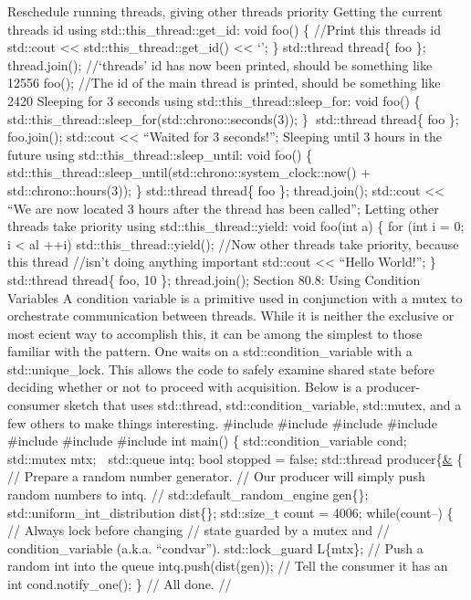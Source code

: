Reschedule running threads, giving other threads priority Getting the
current threads id using std::this\_thread::get\_id: void foo() \{
//Print this threads id std::cout \textless\textless{}
std::this\_thread::get\_id() \textless\textless{} `\n'; \} std::thread
thread\{ foo \}; thread.join(); //`threads' id has now been printed,
should be something like 12556 foo(); //The id of the main thread is
printed, should be something like 2420 Sleeping for 3 seconds using
std::this\_thread::sleep\_for: void foo() \{
std::this\_thread::sleep\_for(std::chrono::seconds(3)); \} std::thread
thread\{ foo \}; foo.join(); std::cout \textless\textless{} ``Waited for
3 seconds!\n''; Sleeping until 3 hours in the future using
std::this\_thread::sleep\_until: void foo() \{
std::this\_thread::sleep\_until(std::chrono::system\_clock::now() +
std::chrono::hours(3)); \} std::thread thread\{ foo \}; thread.join();
std::cout \textless\textless{} ``We are now located 3 hours after the
thread has been called\n''; Letting other threads take priority using
std::this\_thread::yield: void foo(int a) \{ for (int i = 0; i
\textless{} al ++i) std::this\_thread::yield(); //Now other threads take
priority, because this thread //isn't doing anything important std::cout
\textless\textless{} ``Hello World!\n''; \} std::thread thread\{ foo, 10
\}; thread.join(); Section 80.8: Using Condition Variables A condition
variable is a primitive used in conjunction with a mutex to orchestrate
communication between threads. While it is neither the exclusive or most
ecient way to accomplish this, it can be among the simplest to those
familiar with the pattern. One waits on a std::condition\_variable with
a std::unique\_lock. This allows the code to safely examine shared state
before deciding whether or not to proceed with acquisition. Below is a
producer-consumer sketch that uses std::thread,
std::condition\_variable, std::mutex, and a few others to make things
interesting. \#include \#include \#include \#include \#include \#include
\#include int main() \{ std::condition\_variable cond; std::mutex mtx; 
std::queue intq; bool stopped = false; std::thread producer\{\href{}{\&}
\{ // Prepare a random number generator. // Our producer will simply
push random numbers to intq. // std::default\_random\_engine gen\{\};
std::uniform\_int\_distribution dist\{\}; std::size\_t count = 4006;
while(count--) \{ // Always lock before changing // state guarded by a
mutex and // condition\_variable (a.k.a. ``condvar''). std::lock\_guard
L\{mtx\}; // Push a random int into the queue intq.push(dist(gen)); //
Tell the consumer it has an int cond.notify\_one(); \} // All done. //
